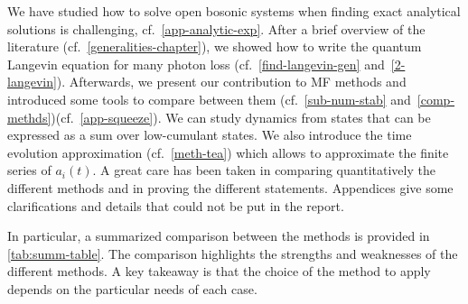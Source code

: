 We have studied how to solve open bosonic systems when finding exact analytical solutions is challenging, cf.\@~\autoref{app-analytic-exp}. After a brief overview of the literature (cf.\@~\autoref{generalities-chapter}), we showed how to write the quantum Langevin equation for many photon loss (cf.\@~\autoref{find-langevin-gen} and~\autoref{2-langevin}). Afterwards, we present our contribution to MF methods and introduced some tools to compare between them (cf.\@~\autoref{sub-num-stab} and~\autoref{comp-methds})(cf.\@~\autoref{app-squeeze}). We can study dynamics from states that can be expressed as a sum over low-cumulant states.  We also introduce the time evolution approximation (cf.\@~\autoref{meth-tea}) which allows to approximate the finite series of $a_i(t)$. A great care has been taken in comparing quantitatively the different methods and in proving the different statements. Appendices give some clarifications and details that could not be put in the report.

In particular, a summarized comparison between the methods is provided in \autoref{tab:summ-table}. The comparison highlights the strengths and weaknesses of the different methods. A key takeaway is that the choice of the method to apply depends on the particular needs of each case.